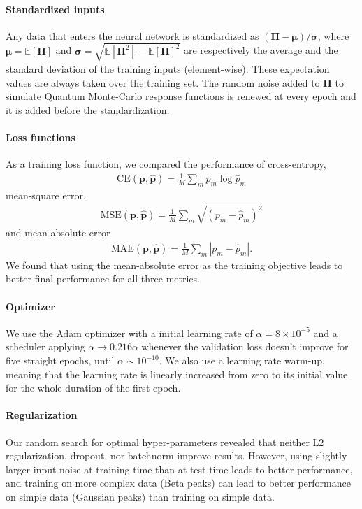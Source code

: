 \documentclass[notitlepage,11pt,nofootinbib]{revtex4-1}
\renewcommand{\vec}[1]{\bm{#1}}
\begin{document}
\paragraph*{Standardized inputs} Any data that enters the neural network is standardized as $(\vec \Pi - \vec\mu)/\vec\sigma$, where $\vec \mu = \mathbb{E}[\vec \Pi]$ and $\vec \sigma = \sqrt{\mathbb{E}[\vec \Pi^2] - \mathbb{E}[\vec \Pi]^2}$ are respectively the average and the standard deviation of the training inputs (element-wise). These expectation values are always taken over the training set. The random noise added to $\vec \Pi$ to simulate Quantum Monte-Carlo response functions is renewed at every epoch and it is added before the standardization.

\paragraph*{Loss functions} As a training loss function, we compared the performance of cross-entropy, 
\begin{align}
    \text{CE}(\vec p,\hat{\vec p}) = \frac{1}{M}\sum_m p_m \log \hat{p}_m
\end{align}
mean-square error, 
\begin{align}
    \text{MSE}(\vec p,\hat{\vec p}) = \frac{1}{M}\sum_m \sqrt{(p_m - \hat{p}_m)^2}
\end{align}
and mean-absolute error
\begin{align}
    \text{MAE}(\vec p,\hat{\vec p}) = \frac{1}{M}\sum_m |p_m - \hat{p}_m|.
\end{align}
We found that using the mean-absolute error as the training objective leads to better final performance for all three metrics.

\paragraph*{Optimizer} We use the Adam optimizer with a initial learning rate of $\alpha = 8\times10^{-5}$ and a scheduler applying $\alpha \rightarrow 0.216\alpha$ whenever the validation loss doesn't improve for five straight epochs, until $\alpha\sim10^{-10}$. We also use a learning rate warm-up, meaning that the learning rate is linearly increased from zero to its initial value for the whole duration of the first epoch.

\paragraph*{Regularization} Our random search for optimal hyper-parameters revealed that neither L2 regularization, dropout, nor batchnorm improve results. However, using slightly larger input noise at training time than at test time leads to better performance, and training on more complex data (Beta peaks) can lead to better performance on simple data (Gaussian peaks) than training on simple data.
\end{document}
